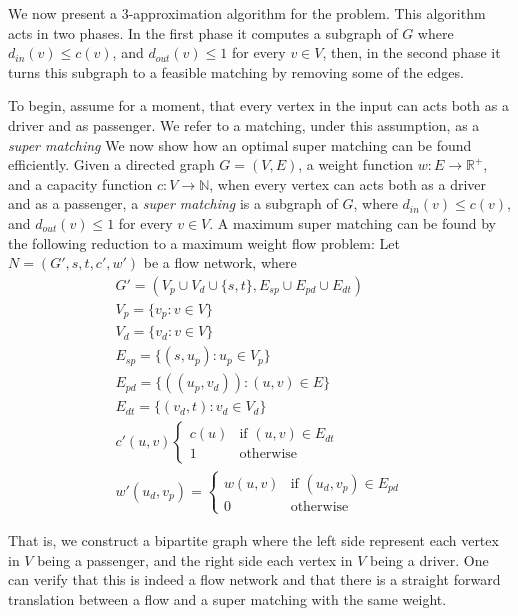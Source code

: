We now present a 3-approximation algorithm for the \textsc{\CARPOOL{}} problem.
This algorithm acts in two phases.
In the first phase it computes a subgraph of $G$ 
where $d_{in}(v) \leq c(v)$, and $d_{out}(v) \leq 1$ for every $v \in V$, 
then, in the second phase it turns this subgraph to a feasible matching
by removing some of the edges.

To begin, assume for a moment, 
that every vertex in the input can acts both as a driver and as passenger.
We refer to a matching, under this assumption, as a \emph{super matching}
We now show how an optimal super matching can be found efficiently.
Given a directed graph $G = (V, E)$,
a weight function $w : E \rightarrow \mathbb{R^+}$,
and a capacity function $c : V \rightarrow \mathbb{N}$, 
when every vertex can acts both as a driver and as a passenger, 
a \emph{super matching} is a subgraph of $G$, 
where $d_{in}(v) \leq c(v)$, and $d_{out}(v) \leq 1$ for every $v \in V$. 
A maximum super matching can be found by the following reduction 
to a maximum weight flow problem: 
Let $N = (G', s, t, c', w')$ be a flow network, where 
\begin{align*}
G' = (V_p \cup V_d \cup \{s, t\}, E_{sp} \cup E_{pd} \cup E_{dt})	\\
V_p = \{v_p : v \in V\} \\
V_d = \{v_d : v \in V\} \\
E_{sp} = \{ (s, u_p) : u_p \in V_p \} \\
E_{pd} = \{ ((u_p, v_d)) : (u, v) \in E \} \\
E_{dt} = \{ (v_d, t) : v_d \in V_d \} \\
c'(u, v) 
\begin{cases}
c(u) & \text{if } (u, v) \in E_{dt} \\
1 & \text{otherwise}	
\end{cases}
\\
w'(u_d, v_p) = 
\begin{cases}
w(u, v) & \text{if } (u_d, v_p) \in E_{pd} \\
0 & \text{otherwise}	
\end{cases}
\end{align*}

That is, 
we construct a bipartite graph where the left side represent each vertex 
in $V$ being a passenger,
and the right side each vertex in $V$ being a driver.
One can verify that this is indeed a flow network and that there is a straight forward 
translation between a flow and a super matching with the same weight.


